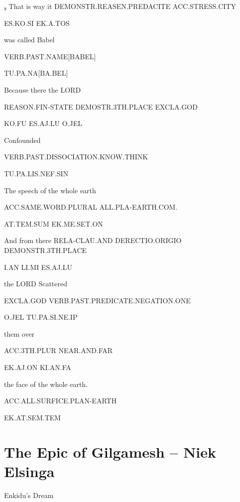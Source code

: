  

₉ That is way 				it 			DEMONSTR.REASEN.PREDACITE	ACC.STRESS.CITY	 

ES.KO.SI				EK.A.TOS		 

 

was called Babel 

VERB.PAST.NAME[BABEL] 

TU.PA.NA[BA.BEL] 

  

Because 		there 				the LORD  

REASON.FIN-STATE          DEMOSTR.3TH.PLACE		EXCLA.GOD 

KO.FU			ES.AJ.LU			O.JEL 

  

Confounded 

VERB.PAST.DISSOCIATION.KNOW.THINK	 

TU.PA.LIS.NEF.SIN                                               			 

 

The speech			 of the whole earth 

ACC.SAME.WORD.PLURAL 	ALL.PLA-EARTH.COM. 

AT.TEM.SUM			EK.ME.SET.ON 

 

And 			from 			there 		RELA-CLAU.AND	DERECTIO.ORIGIO      DEMONSTR.3TH.PLACE 

I.AN			LI.MI			ES.AJ.LU			 

the LORD	Scattered 

EXCLA.GOD	VERB.PAST.PREDICATE.NEGATION.ONE 

O.JEL		TU.PA.SI.NE.IP    

 

 them 		over 		 

ACC.3TH.PLUR	NEAR.AND.FAR	 

EK.AJ.ON	KI.AN.FA               

  

the face of the whole earth. 

ACC.ALL.SURFICE.PLAN-EARTH 

EK.AT.SEM.TEM 



\section{The Epic of Gilgamesh -- {\small Niek Elsinga}}


Enkidu’s Dream 

 
 

